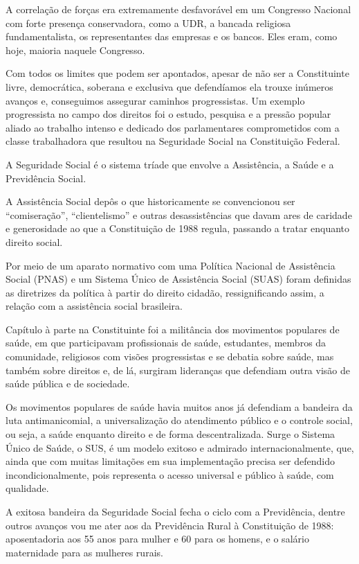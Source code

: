 A correlação de forças era extremamente desfavorável em um Congresso
Nacional com forte presença conservadora, como a UDR, a bancada
religiosa fundamentalista, os representantes das empresas e os bancos.
Eles eram, como hoje, maioria naquele Congresso.

Com todos os limites que podem ser apontados, apesar de não ser a
Constituinte livre, democrática, soberana e exclusiva que defendíamos
ela trouxe inúmeros avanços e, conseguimos assegurar caminhos
progressistas. Um exemplo progressista no campo dos direitos foi o
estudo, pesquisa e a pressão popular aliado ao trabalho intenso e
dedicado dos parlamentares comprometidos com a classe trabalhadora que
resultou na Seguridade Social na Constituição Federal.

A Seguridade Social é o sistema tríade que envolve a Assistência, a
Saúde e a Previdência Social.

A Assistência Social depôs o que historicamente se convencionou ser
``comiseração'', ``clientelismo'' e outras desassistências que davam
ares de caridade e generosidade ao que a Constituição de 1988 regula,
passando a tratar enquanto direito social.

Por meio de um aparato normativo com uma Política Nacional de
Assistência Social (PNAS) e um Sistema Único de Assistência Social
(SUAS) foram definidas as diretrizes da política à partir do direito
cidadão, ressignificando assim, a relação com a assistência social
brasileira.

Capítulo à parte na Constituinte foi a militância dos movimentos
populares de saúde, em que participavam profissionais de saúde,
estudantes, membros da comunidade, religiosos com visões progressistas e
se debatia sobre saúde, mas também sobre direitos e, de lá, surgiram
lideranças que defendiam outra visão de saúde pública e de sociedade.

Os movimentos populares de saúde havia muitos anos já defendiam a
bandeira da luta antimanicomial, a universalização do atendimento
público e o controle social, ou seja, a saúde enquanto direito e de
forma descentralizada. Surge o Sistema Único de Saúde, o SUS, é um
modelo exitoso e admirado internacionalmente, que, ainda que com muitas
limitações em sua implementação precisa ser defendido
incondicionalmente, pois representa o acesso universal e público à
saúde, com qualidade.

A exitosa bandeira da Seguridade Social fecha o ciclo com a Previdência,
dentre outros avanços vou me ater aos da Previdência Rural à
Constituição de 1988: aposentadoria aos 55 anos para mulher e 60 para os
homens, e o salário maternidade para as mulheres rurais.

